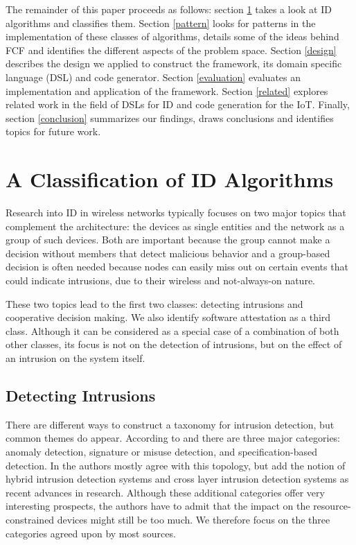 \documentclass[conference]{IEEEtran}
\begin{document}

The remainder of this paper proceeds as follows: section \ref{classification}
takes a look at ID algorithms and classifies them. Section \ref{pattern} looks
for patterns in the implementation of these classes of algorithms, details some
of the ideas behind FCF and identifies the different aspects of the problem
space. Section \ref{design} describes the design we applied to construct the
framework, its domain specific language (DSL) and code generator. Section
\ref{evaluation} evaluates an implementation and application of the framework.
Section \ref{related} explores related work in the field of DSLs for ID and
code generation for the IoT. Finally, section \ref{conclusion} summarizes our
findings, draws conclusions and identifies topics for future work.

\section{A Classification of ID Algorithms}
\label{classification}

Research into ID in wireless networks typically focuses on two major topics
that complement the architecture: the devices as single entities and the
network as a group of such devices. Both are important because the group cannot
make a decision without members that detect malicious behavior and a
group-based decision is often needed because nodes can easily miss out on
certain events that could indicate intrusions, due to their wireless and
not-always-on nature.

These two topics lead to the first two classes: detecting intrusions and
cooperative decision making. We also identify software attestation as a third
class. Although it can be considered as a special case of a combination of both
other classes, its focus is not on the detection of intrusions, but on the
effect of an intrusion on the system itself.

\subsection*{Detecting Intrusions}
\label{detection}

There are different ways to construct a taxonomy for intrusion detection, but
common themes do appear. According to \cite{mishra2004intrusion} and
\cite{ioannis2007towards} there are three major categories: anomaly detection,
signature or misuse detection, and specification-based detection. In
\cite{alrajeh2013intrusion} the authors mostly agree with this topology, but
add the notion of hybrid intrusion detection systems and cross layer intrusion
detection systems as recent advances in research. Although these additional
categories offer very interesting prospects, the authors have to admit that the
impact on the resource-constrained devices might still be too much. We
therefore focus on the three categories agreed upon by most sources.
\end{document}
